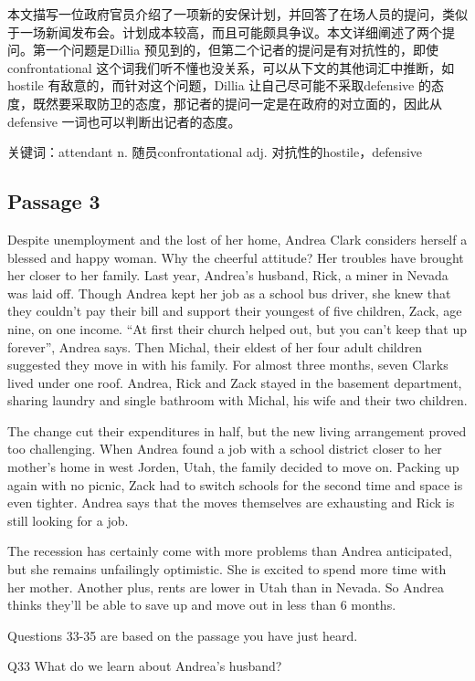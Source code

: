\documentclass[UTF8,11pt]{ctexart}
\begin{document}
本文描写一位政府官员介绍了一项新的安保计划，并回答了在场人员的提问，类似于一场新闻发布会。计划成本较高，而且可能颇具争议。本文详细阐述了两个提问。第一个问题是Dillia 预见到的，但第二个记者的提问是有对抗性的，即使confrontational 这个词我们听不懂也没关系，可以从下文的其他词汇中推断，如hostile 有敌意的，而针对这个问题，Dillia 让自己尽可能不采取defensive 的态度，既然要采取防卫的态度，那记者的提问一定是在政府的对立面的，因此从defensive 一词也可以判断出记者的态度。


关键词：attendant n. 随员confrontational adj. 对抗性的hostile，defensive


\subsection*{Passage 3}


Despite unemployment and the lost of her home, Andrea Clark considers herself a blessed and happy woman. Why the cheerful attitude? Her troubles have brought her closer to her family. Last year, Andrea’s husband, Rick, a miner in Nevada was laid off. Though Andrea kept her job as a school bus driver, she knew that they couldn’t pay their bill and support their youngest of five children, Zack, age nine, on one income. “At first their church helped out, but you can’t keep that up forever”, Andrea says. Then Michal, their eldest of her four adult children suggested they move in with his family. For almost three months, seven Clarks lived under one roof. Andrea, Rick and Zack stayed in the basement department, sharing laundry and single bathroom with Michal, his wife and their two children.


The change cut their expenditures in half, but the new living arrangement proved too challenging. When Andrea found a job with a school district closer to her mother’s home in west Jorden, Utah, the family decided to move on. Packing up again with no picnic, Zack had to switch schools for the second time and space is even tighter. Andrea says that the moves themselves are exhausting and Rick is still looking for a job.


The recession has certainly come with more problems than Andrea anticipated, but she remains unfailingly optimistic. She is excited to spend more time with her mother. Another plus, rents are lower in Utah than in Nevada. So Andrea thinks they’ll be able to save up and move out in less than 6 months.


Questions 33-35 are based on the passage you have just heard.


Q33 What do we learn about Andrea’s husband?
\end{document}
